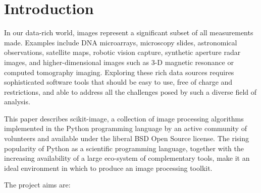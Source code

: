 
\section*{Introduction}
  \label{sec:introduction}

  In our data-rich world, images represent a significant subset of all measurements made. Examples include DNA microarrays, microscopy slides, astronomical observations, satellite maps, robotic vision capture, synthetic aperture radar images, and higher-dimensional images such as 3-D magnetic resonance or computed tomography imaging. Exploring these rich data sources requires sophisticated software tools that should be easy to use, free of charge and restrictions, and able to address all the challenges posed by such a diverse field of analysis.

  This paper describes scikit-image, a collection of image processing algorithms implemented in the Python programming language by an active community of volunteers and available under the liberal BSD Open Source license. The rising popularity of Python as a scientific programming language, together with the increasing availability of a large eco-system of complementary tools, make it an ideal environment in which to produce an image processing toolkit.

  The project aims are:

